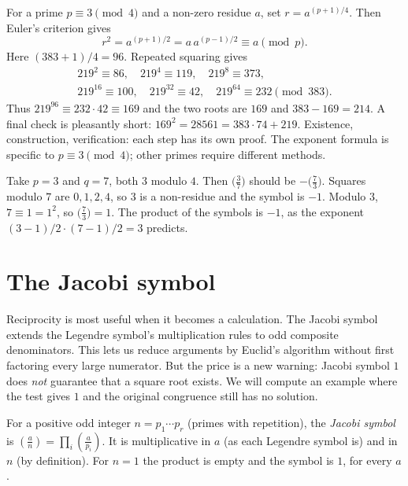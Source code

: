 For a prime $p\equiv3\pmod4$ and a non-zero residue $a$, set
$r=a^{(p+1)/4}$. Then Euler's criterion gives
\[
 r^2=a^{(p+1)/2}=a\,a^{(p-1)/2}\equiv a\pmod p.
\]
Here $(383+1)/4=96$. Repeated squaring gives
\[
\begin{gathered}
219^2\equiv86,\quad219^4\equiv119,\quad219^8\equiv373,\\
219^{16}\equiv100,\quad219^{32}\equiv42,\quad219^{64}\equiv232
\pmod{383}.
\end{gathered}
\]
Thus $219^{96}\equiv232\cdot42\equiv169$ and the two roots are $169$ and
$383-169=214$. A final check is pleasantly short:
$169^2=28561=383\cdot74+219$. Existence, construction, verification:
each step has its own proof. The exponent formula is specific to
$p\equiv3\pmod4$; other primes require different methods.



\begin{examplex}
Take $p=3$ and $q=7$, both $3$ modulo $4$. Then $\bigl(\frac{3}{7}\bigr)$ should be $-\bigl(\frac{7}{3}\bigr)$.
Squares modulo $7$ are $0,1,2,4$, so $3$ is a non-residue and the symbol is $-1$.
Modulo $3$, $7\equiv 1=1^2$, so $\bigl(\frac{7}{3}\bigr)=1$. The product of the symbols is $-1$, as the exponent $(3-1)/2\cdot(7-1)/2=3$ predicts.
\end{examplex}

\section{The Jacobi symbol}

Reciprocity is most useful when it becomes a calculation. The Jacobi symbol extends the Legendre symbol's multiplication rules to odd composite denominators. This lets us reduce arguments by Euclid's algorithm without first factoring every large numerator. But the price is a new warning: Jacobi symbol $1$ does \emph{not} guarantee that a square root exists. We will compute an example where the test gives $1$ and the original congruence still has no solution.

For a positive odd integer $n=p_1\cdots p_r$ (primes with repetition), the \emph{Jacobi symbol} is $\left(\frac an\right)=\prod_i\left(\frac a{p_i}\right)$. It is multiplicative in $a$ (as each Legendre symbol is) and in $n$ (by definition). For $n=1$ the product is empty and the symbol is $1$, for every $a$.

